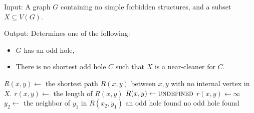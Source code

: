 \begin{alg}
	\label{alg:testNearCleaner}
	Input: A graph $G$ containing no simple forbidden structures, and a subset $X \subseteq V(G)$.

	\noindent Output: Determines one of the following:
	\begin{itemize}
		\item $G$ has an odd hole,
		\item There is no shortest odd hole $C$ such that $X$ is a near-cleaner for $C$.
	\end{itemize}
\end{alg}

\begin{algorithmic}[1]
				\ls $R(x, y) \gets$ the shortest path $R(x, y)$ between $x, y$ with no
				\lsx internal vertex in $X$.
				\ls $r(x, y) \gets$ the length of $R(x, y)$
			\mElse
				\ls $R(x, y) \gets \textsc{undefined}$
				\ls $r(x, y) \gets \infty$
			\mEndIf
			 \label{line:cudaStart}
				 \label{line:3vertex}
					 \label{line:cudaWorkStard}
						\ls $y_2 \gets$ the neighbor of $y_1$ in $R(x_2, y_1)$ \label{line:definey2}
						\ls \RETURN an odd hole found
						\mEndIf
					\mEndIf \label{line:cudaWorkEnd}
				\mEndFor
			\mEndFor \label{line:cudaEnd}
		\mEndFor
		\ls \RETURN no odd hole found
	\mEndProcedure
\end{algorithmic}


